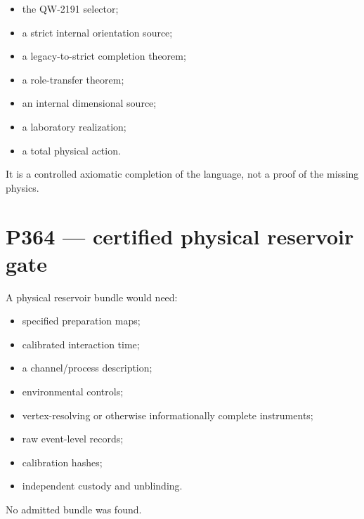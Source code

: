 \documentclass[11pt,a4paper,openany]{report}
\begin{document}
\begin{itemize}
\item 
the QW-2191 selector;

\item 
a strict internal orientation source;

\item 
a legacy-to-strict completion theorem;

\item 
a role-transfer theorem;

\item 
an internal dimensional source;

\item 
a laboratory realization;

\item 
a total physical action.

\end{itemize}

It is a controlled axiomatic completion of the language, not a proof of the missing physics.

\chapter{P364 --- certified physical reservoir gate}

A physical reservoir bundle would need:

\begin{itemize}
\item 
specified preparation maps;

\item 
calibrated interaction time;

\item 
a channel/\allowbreak{}process description;

\item 
environmental controls;

\item 
vertex-resolving or otherwise informationally complete instruments;

\item 
raw event-level records;

\item 
calibration hashes;

\item 
independent custody and unblinding.

\end{itemize}

No admitted bundle was found.
\end{document}
